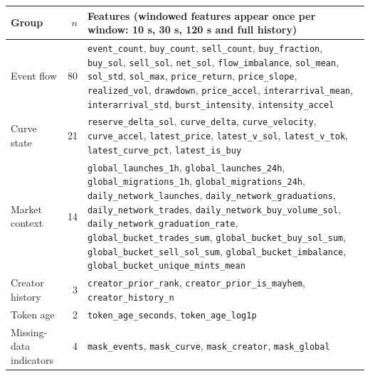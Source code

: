 \begin{tabularx}{\linewidth}{lrX}
\toprule
Group & $n$ & Features (windowed features appear once per window: 10 s, 30 s, 120 s and full history) \\
\midrule
Event flow & 80 & \texttt{event\_count}, \texttt{buy\_count}, \texttt{sell\_count}, \texttt{buy\_fraction}, \texttt{buy\_sol}, \texttt{sell\_sol}, \texttt{net\_sol}, \texttt{flow\_imbalance}, \texttt{sol\_mean}, \texttt{sol\_std}, \texttt{sol\_max}, \texttt{price\_return}, \texttt{price\_slope}, \texttt{realized\_vol}, \texttt{drawdown}, \texttt{price\_accel}, \texttt{interarrival\_mean}, \texttt{interarrival\_std}, \texttt{burst\_intensity}, \texttt{intensity\_accel} \\
Curve state & 21 & \texttt{reserve\_delta\_sol}, \texttt{curve\_delta}, \texttt{curve\_velocity}, \texttt{curve\_accel}, \texttt{latest\_price}, \texttt{latest\_v\_sol}, \texttt{latest\_v\_tok}, \texttt{latest\_curve\_pct}, \texttt{latest\_is\_buy} \\
Market context & 14 & \texttt{global\_launches\_1h}, \texttt{global\_launches\_24h}, \texttt{global\_migrations\_1h}, \texttt{global\_migrations\_24h}, \texttt{daily\_network\_launches}, \texttt{daily\_network\_graduations}, \texttt{daily\_network\_trades}, \texttt{daily\_network\_buy\_volume\_sol}, \texttt{daily\_network\_graduation\_rate}, \texttt{global\_bucket\_trades\_sum}, \texttt{global\_bucket\_buy\_sol\_sum}, \texttt{global\_bucket\_sell\_sol\_sum}, \texttt{global\_bucket\_imbalance}, \texttt{global\_bucket\_unique\_mints\_mean} \\
Creator history & 3 & \texttt{creator\_prior\_rank}, \texttt{creator\_prior\_is\_mayhem}, \texttt{creator\_history\_n} \\
Token age & 2 & \texttt{token\_age\_seconds}, \texttt{token\_age\_log1p} \\
Missing-data indicators & 4 & \texttt{mask\_events}, \texttt{mask\_curve}, \texttt{mask\_creator}, \texttt{mask\_global} \\
\bottomrule
\end{tabularx}
